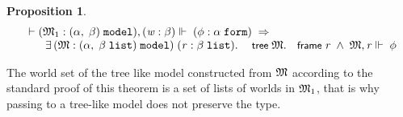 \documentclass{llncs}
\newtheorem{prop}[thm]{Proposition}
\newenvironment{holmath}{\begin{displaymath}\begin{array}{l}}{\end{array}\end{displaymath}\ignorespacesafterend}
\renewcommand{\HOLConst}[1]{{\textsf{\upshape\small #1}}}
\renewcommand{\HOLinline}[1]{\ensuremath{#1}}
\renewcommand{\HOLFieldName}[1]{\HOLConst{#1}}
\begin{document}
\begin{prop}
{\upshape\cite[Proposition 2.15]{Blackburn}}\label{2.15}
\begin{holmath}
  \ensuremath{\HOLTokenTurnstile}(\HOLFreeVar{\ensuremath{\mathfrak{M}}}\sb{\mathrm{1}} :(\ensuremath{\alpha},\;\ensuremath{\beta})\;\HOLTyOp{model}),(\HOLFreeVar{w} :\ensuremath{\beta})\ensuremath{\Vdash}\;(\HOLFreeVar{\ensuremath{\phi}} :\ensuremath{\alpha}\;\HOLTyOp{form})\;\HOLSymConst{\HOLTokenImp{}}\\
\;\;\;\;\;\;\;\HOLSymConst{\HOLTokenExists{}}(\HOLBoundVar{\ensuremath{\mathfrak{M}}} :(\ensuremath{\alpha},\;\ensuremath{\beta}\;\HOLTyOp{list})\;\HOLTyOp{model})\;(\HOLBoundVar{r} :\ensuremath{\beta}\;\HOLTyOp{list}).\;\HOLConst{tree}\;\HOLBoundVar{\ensuremath{\mathfrak{M}}}.\HOLFieldName{frame}\;\HOLBoundVar{r}\;\HOLSymConst{\HOLTokenConj{}}\;\HOLBoundVar{\ensuremath{\mathfrak{M}}},\HOLBoundVar{r}\ensuremath{\Vdash}\;\HOLFreeVar{\ensuremath{\phi}}
\end{holmath}
\end{prop}
The world set of the tree like model constructed from \HOLinline{\HOLFreeVar{\ensuremath{\mathfrak{M}}}} according to the standard proof of this theorem is a set of lists of worlds in \HOLinline{\HOLFreeVar{\ensuremath{\mathfrak{M}}}\sb{\mathrm{1}}}, that is why passing to a tree-like model does not preserve the type. 
\end{document}
